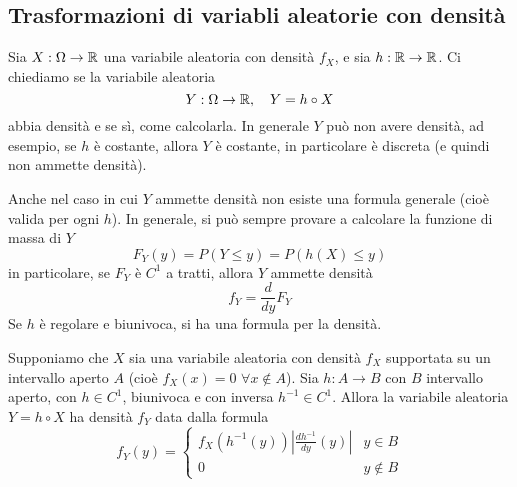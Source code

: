 \subsection{Trasformazioni di variabli aleatorie con densità}
Sia $X : \Omega \to \mathbb{R}$ una variabile aleatoria con densità $f_X$, e sia $h : \mathbb{R} \to \mathbb{R}$. Ci
chiediamo se la variabile aleatoria
\[ Y : \Omega \to \mathbb{R}, \quad Y = h \circ X \]
abbia densità e se sì, come calcolarla. In generale $Y$ può non avere densità, ad esempio, se $h$
è costante, allora $Y$ è costante, in particolare è discreta (e quindi non ammette densità).

Anche nel caso in cui $Y$ ammette densità non esiste una formula generale (cioè valida per ogni
$h$). In generale, si può sempre provare a calcolare la funzione di massa di $Y$
\[ F_Y (y) = P(Y \leq y) = P(h(X) \leq y) \]
in particolare, se $F_Y$ è $C^1$ a tratti, allora $Y$ ammette densità
\[ f_Y = \frac{d}{dy} F_Y \]
Se $h$ è regolare e biunivoca, si ha una formula per la densità.

\begin{proposition}
	Supponiamo che $X$ sia una variabile aleatoria con densità $f_X$ supportata su un intervallo
	aperto $A$ (cioè $f_X(x) = 0$ $\forall x \notin A$). Sia $h : A \to B$ con $B$ intervallo
	aperto, con $h \in C^1$, biunivoca e con inversa $h^{-1} \in C^1$. Allora la variabile
	aleatoria $Y = h \circ X$ ha densità $f_Y$ data dalla formula
	\[
		f_Y(y) = \begin{cases}
			f_X (h^{-1} (y)) \left| \frac{d h^{-1}}{dy} (y) \right| & y \in B    \\[2ex]
			0                                                       & y \notin B
		\end{cases}
	\]
\end{proposition}

